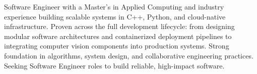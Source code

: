 
Software Engineer with a Master's in Applied Computing and industry experience building scalable systems in C++, Python, and cloud-native infrastructure. Proven across the full development lifecycle: from designing modular software architectures and containerized deployment pipelines to integrating computer vision components into production systems. Strong foundation in algorithms, system design, and collaborative engineering practices. Seeking Software Engineer roles to build reliable, high-impact software.

